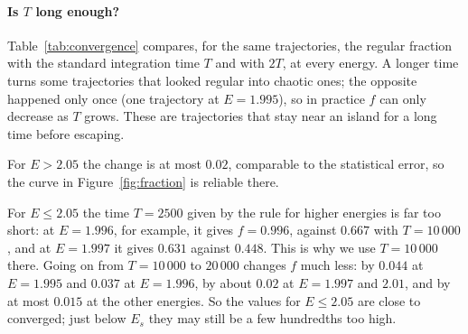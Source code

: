 \documentclass[11pt,a4paper]{article}
\begin{document}
\paragraph{Is $T$ long enough?}
Table~\ref{tab:convergence} compares, for the same trajectories, the regular
fraction with the standard integration time $T$ and with $2T$, at every
energy. A longer time turns some trajectories that looked regular into chaotic
ones; the opposite happened only once (one trajectory at $E=1.995$), so in
practice $f$ can only decrease as $T$ grows. These are trajectories that stay
near an island for a long time before escaping.

For $E>2.05$ the change is at most $0.02$, comparable to the statistical
error, so the curve in Figure~\ref{fig:fraction} is reliable there.

For $E\le2.05$ the time $T=2500$ given by the rule for higher energies is far
too short: at $E=1.996$, for example, it gives $f=0.996$, against $0.667$ with
$T=10\,000$, and at $E=1.997$ it gives $0.631$ against $0.448$. This is why we
use $T=10\,000$ there. Going on from $T=10\,000$ to $20\,000$ changes $f$ much
less: by $0.044$ at $E=1.995$ and $0.037$ at $E=1.996$, by about $0.02$ at
$E=1.997$ and $2.01$, and by at most $0.015$ at the other energies. So the
values for $E\le2.05$ are close to converged; just below $E_s$ they may still
be a few hundredths too high.
\end{document}
